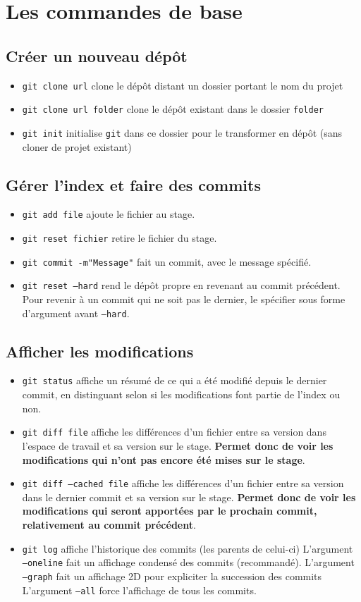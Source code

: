 \documentclass[french]{report}
\newcommand\itemb{\item[$\bullet$]}
\begin{document}
\section{Les commandes de base}

\subsection{Créer un nouveau dépôt}

\begin{itemize}
   \itemb \texttt{git clone url} clone le dépôt distant un dossier portant le nom du projet
    \itemb \texttt{git clone url folder} clone le dépôt existant dans le dossier \texttt{folder}
    \itemb \texttt{git init} initialise \texttt{git} dans ce dossier pour le transformer en dépôt (sans cloner de projet existant)
\end{itemize}

\subsection{Gérer l'index et faire des commits}

\begin{itemize}
    \itemb \texttt{git add file} ajoute le fichier au stage.
    \itemb \texttt{git reset fichier} retire le fichier du stage.
    \itemb \texttt{git commit -m"Message"} fait un commit, avec le message spécifié.
    \itemb \texttt{git reset ---hard} rend le dépôt propre en revenant au commit précédent.
    Pour revenir à un commit qui ne soit pas le dernier, le spécifier sous forme d'argument avant \texttt{---hard}.
\end{itemize}

\subsection{Afficher les modifications}

\begin{itemize}
    \itemb \texttt{git status} affiche un résumé de ce qui a été modifié depuis le dernier commit, en distinguant selon si les modifications font partie de l'index ou non.
    \itemb \texttt{git diff file} affiche les différences d'un fichier entre sa version dans l'espace de travail et sa version sur le stage.
    \textbf{Permet donc de voir les modifications qui n'ont pas encore été mises sur le stage}.
    \itemb \texttt{git diff ---cached file} affiche les différences d'un fichier entre sa version dans le dernier commit et sa version sur le stage.
    \textbf{Permet donc de voir les modifications qui seront apportées par le prochain commit, relativement au commit précédent}.
    \itemb \texttt{git log} affiche l'historique des commits (les parents de celui-ci)
    L'argument \texttt{---oneline} fait un affichage condensé des commits (recommandé).
    L'argument \texttt{---graph} fait un affichage 2D pour expliciter la succession des commits
    L'argument \texttt{---all} force l'affichage de tous les commits.
\end{itemize}
\end{document}

